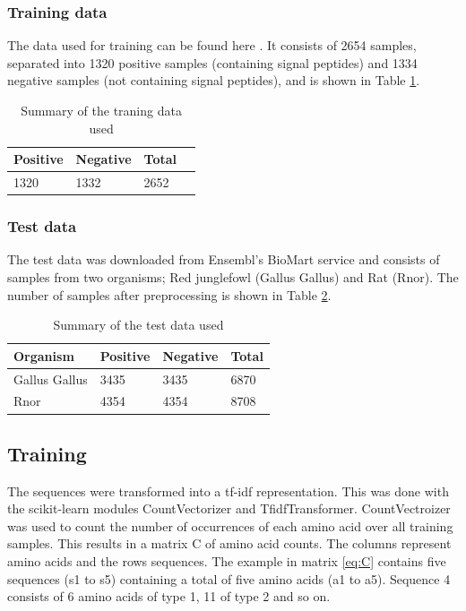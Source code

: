 \documentclass[10pt]{article}
\begin{document}
\subsubsection{Training data}
The data used for training can be found here \cite{website:project-description}.
It consists of 2654 samples, separated into 1320 positive samples (containing signal peptides) and 1334 negative
samples (not containing signal peptides), and is shown in Table \ref{table:trainingdata}.

\begin{table}[h]
\begin{center}
\begin{tabular}{| l | l | l | l |}
\hline
Positive & Negative & Total\\ \hline
1320 & 1332 & 2652\\ \hline
\end{tabular}
\end{center}
\caption{Summary of the traning data used}
\label{table:trainingdata}
\end{table}

\subsubsection{Test data}
The test data was downloaded from Ensembl's BioMart service \cite{website:ensembl}
and consists of samples from two organisms; Red junglefowl (Gallus Gallus) and Rat (Rnor). The number of samples
after preprocessing is shown in Table \ref{table:testdata}.

\begin{table}[h]
\begin{center}
\begin{tabular}{| l | l | l | l |}
\hline
Organism & Positive & Negative & Total\\ \hline
Gallus Gallus & 3435 & 3435 & 6870\\ \hline
Rnor & 4354 & 4354 & 8708\\ \hline
\end{tabular}
\end{center}
\caption{Summary of the test data used}
\label{table:testdata}
\end{table}

\subsection{Training}
The sequences were transformed into a tf-idf representation. This was done with the scikit-learn modules CountVectorizer and TfidfTransformer.
CountVectroizer was used to count the number of occurrences of each amino acid over all training samples. This results in a matrix C of amino acid counts.
The columns represent amino acids and the rows sequences.
The example in matrix \ref{eq:C} contains five sequences (s1 to s5) containing a total of five amino acids (a1 to a5). Sequence 4 consists of 6 amino acids of type 1, 11 of type 2 and so on.
\end{document}
